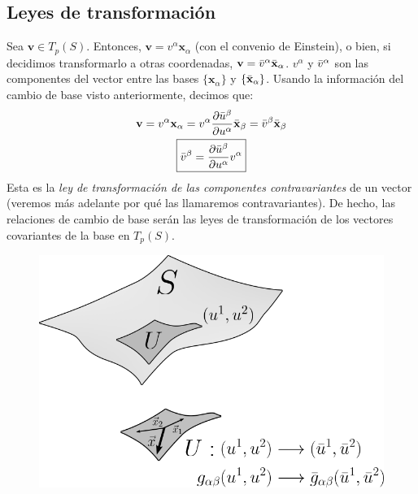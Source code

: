 \subsection{Leyes de transformación}
Sea $\mathbf{v}\in T_p(S)$. Entonces, $\mathbf{v}=v^\alpha \mathbf{x}_\alpha$ (con el convenio de Einstein), o bien, si decidimos transformarlo a otras coordenadas, $\mathbf{v}=\Bar{v}^\alpha \Bar{\mathbf{x}}_\alpha$. $v^\alpha$ y $\Bar{v}^\alpha$ son las componentes del vector entre las bases $\{ \mathbf{x}_\alpha \}$ y $\{ \Bar{\mathbf{x}}_\alpha \}$. Usando la información del cambio de base visto anteriormente, decimos que:
\begin{gather*}
    \mathbf{v}=v^\alpha \mathbf{x}_\alpha =v^\alpha \pdv{\Bar{u}^\beta}{u^\alpha} \Bar{\mathbf{x}}_\beta=\Bar{v}^\beta \Bar{\mathbf{x}}_\beta \\
    \boxed{\Bar{v}^\beta=\pdv{\Bar{u}^\beta}{u^\alpha}v^\alpha}
\end{gather*}
Esta es la \emph{ley de transformación de las componentes contravariantes} de un vector (veremos más adelante por qué las llamaremos contravariantes). De hecho, las relaciones de cambio de base serán las leyes de transformación de los vectores covariantes de la base en $T_p(S)$.\\

\begin{figure}
    \centering
    \includegraphics[scale=.45]{FOTOS/forma_fundamental_trans.png}
\end{figure}

